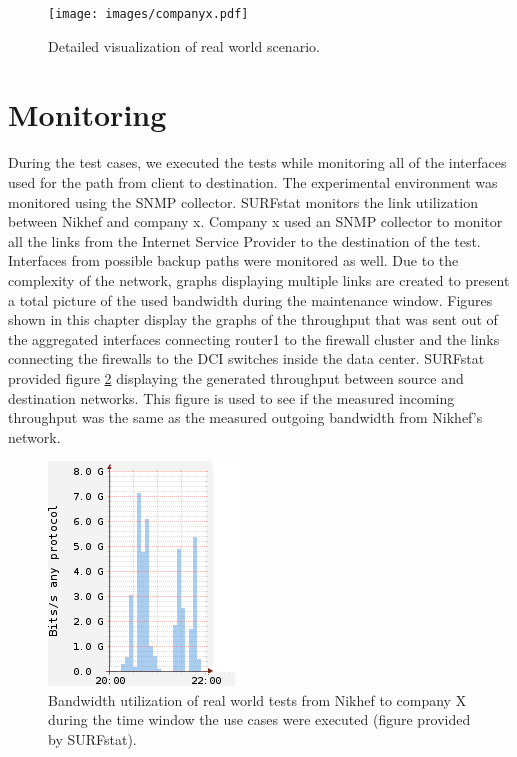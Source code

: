 \begin{figure}[H] 
  \texttt{[image: images/companyx.pdf]}
  \caption{Detailed visualization of real world scenario.}
  \label{fig:companyx}
\end{figure}

\section{Monitoring}\label{sec:monitoring}
During the test cases, we executed the tests while monitoring all of the interfaces used for the path from client to destination.
The experimental environment was monitored using the SNMP collector. SURFstat monitors the link utilization between Nikhef and company x. Company x used an SNMP collector to monitor all the links from the Internet Service Provider to the destination of the test.    
Interfaces from possible backup paths were monitored as well. 
Due to the complexity of the network, graphs displaying multiple links are created to present a total picture of the used bandwidth during the maintenance window.
Figures shown in this chapter display the graphs of the throughput that was sent out of the aggregated interfaces connecting router1 to the firewall cluster and the links connecting the firewalls to the DCI switches inside the data center. 
SURFstat provided figure \ref{fig:surftest} displaying the generated throughput between source and destination networks.
This figure is used to see if the measured incoming throughput was the same as the measured outgoing bandwidth from Nikhef's network.

\begin{center}
\begin{figure}[H]
  \includegraphics[scale=0.8]{images/test-link-usage.png}
  \caption{Bandwidth utilization of real world tests from Nikhef to company X during the time window the use cases were executed (figure provided by SURFstat).}
  \label{fig:surftest}
\end{figure}
\end{center}

